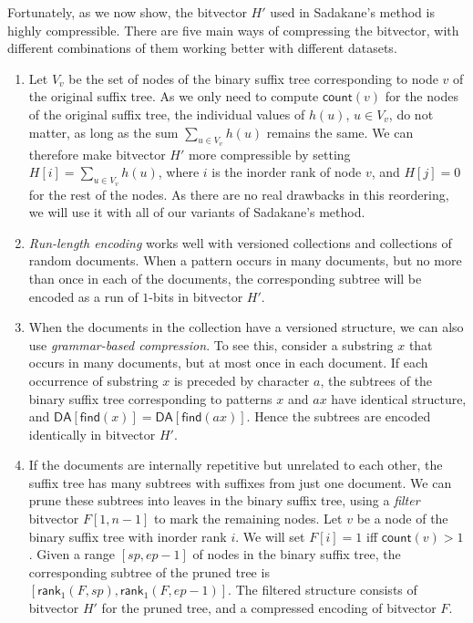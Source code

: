 \documentclass[11pt]{llncs}
\newcommand{\DA}{\ensuremath{\mathsf{DA}}}
\newcommand{\mfind}{\ensuremath{\mathsf{find}}}
\newcommand{\mcount}{\ensuremath{\mathsf{count}}}
\newcommand{\mrank}{\ensuremath{\mathsf{rank}}}
\newcommand{\onebit}{$1$\nobreakdash-bit}
\begin{document}
Fortunately, as we now show, the bitvector $H'$ used in Sadakane's method is highly compressible. There are five main ways of compressing the bitvector, with different combinations of them working better with different datasets.

\begin{enumerate}

\item Let $V_{v}$ be the set of nodes of the binary suffix tree corresponding to node $v$ of the original suffix tree. As we only need to compute $\mcount(v)$ for the nodes of the original suffix tree, the individual values of $h(u)$, $u \in V_{v}$, do not matter, as long as the sum $\sum_{u \in V_{v}} h(u)$ remains the same. We can therefore make bitvector $H'$ more compressible by setting $H[i] = \sum_{u \in V_{v}} h(u)$, where $i$ is the inorder rank of node $v$, and $H[j] = 0$ for the rest of the nodes. As there are no real drawbacks in this reordering, we will use it with all of our variants of Sadakane's method.

\item \emph{Run-length encoding} works well with versioned collections and
collections of random documents. When a pattern occurs in many documents, but no more than once in each of the documents, the corresponding subtree will be encoded as a run of \onebit{}s in bitvector $H'$.

\item When the documents in the collection have a versioned structure, we can also use \emph{grammar-based compression}. To see this, consider a substring $x$ that occurs in many documents, but at most once in each document. If each occurrence of substring $x$ is preceded by character $a$, the subtrees of the binary suffix tree corresponding to patterns $x$ and $ax$ have identical structure, and $\DA[\mfind(x)] = \DA[\mfind(ax)]$. Hence the subtrees are encoded identically in bitvector $H'$.

\item If the documents are internally repetitive but unrelated to each other,
the suffix tree has many subtrees with suffixes from just one document. We can
prune these subtrees into leaves in the binary suffix tree, using a
\emph{filter} bitvector $F[1,n-1]$ to mark the remaining nodes. Let $v$ be a
node of the binary suffix tree with inorder rank $i$. We will set $F[i] = 1$
iff $\mcount(v) > 1$. Given a range $[sp,ep-1]$ of nodes in the binary suffix tree, the corresponding subtree of the pruned tree is $[\mrank_{1}(F,sp), \mrank_{1}(F, ep-1)]$. The filtered structure consists of bitvector $H'$ for the pruned tree, and a compressed encoding of bitvector $F$.


\end{enumerate}
\end{document}
